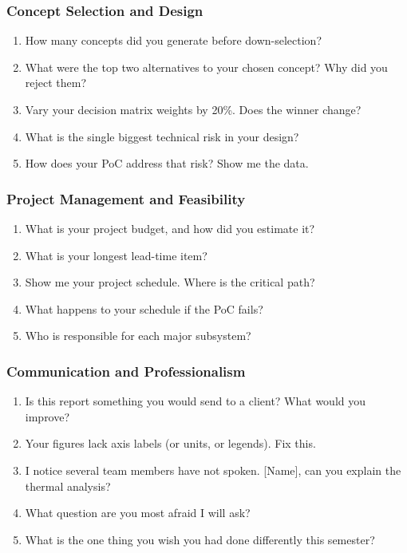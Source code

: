 \subsubsection*{Concept Selection and Design}
\begin{enumerate}[nosep,leftmargin=1.5em,start=6]
\item How many concepts did you generate before down-selection?
\item What were the top two alternatives to your chosen concept? Why did you reject them?
\item Vary your decision matrix weights by 20\%. Does the winner change?
\item What is the single biggest technical risk in your design?
\item How does your PoC address that risk? Show me the data.
\end{enumerate}

\subsubsection*{Project Management and Feasibility}
\begin{enumerate}[nosep,leftmargin=1.5em,start=11]
\item What is your project budget, and how did you estimate it?
\item What is your longest lead-time item?
\item Show me your project schedule. Where is the critical path?
\item What happens to your schedule if the PoC fails?
\item Who is responsible for each major subsystem?
\end{enumerate}

\subsubsection*{Communication and Professionalism}
\begin{enumerate}[nosep,leftmargin=1.5em,start=16]
\item Is this report something you would send to a client? What would you improve?
\item Your figures lack axis labels (or units, or legends). Fix this.
\item I notice several team members have not spoken. [Name], can you explain the thermal analysis?
\item What question are you most afraid I will ask?
\item What is the one thing you wish you had done differently this semester?
\end{enumerate}

